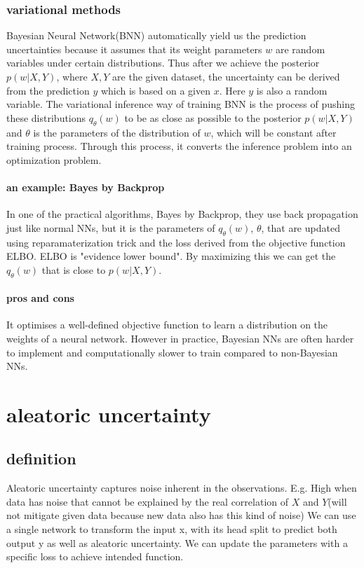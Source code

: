 \documentclass{ctexart}
\begin{document}
\subsubsection{variational methods}
Bayesian Neural Network(BNN) automatically yield us the prediction uncertainties because it assumes that its weight parameters $w$ are random variables under certain distributions. Thus after we achieve the posterior $p(w|X,Y)$, where $X,Y$ are the given dataset, the uncertainty can be derived from the prediction $y$ which is based on a given $x$. Here $y$ is also a random variable. The variational inference way of training BNN is the process of pushing these distributions $q_\theta(w)$ to be as close as possible to the posterior $p(w|X,Y)$ and $\theta$ is the parameters of the distribution of $w$, which will be constant after training process. Through this process, it converts the inference problem into an optimization problem.
\paragraph{an example: Bayes by Backprop}
In one of the practical algorithms, Bayes by Backprop\cite{blundell2015weight}, they use back propagation just like normal NNs, but it is the parameters of $q_\theta(w)$, $\theta$, that are updated using reparamaterization trick and the loss derived from the objective function ELBO. ELBO is "evidence lower bound". By maximizing this we can get the $q_\theta(w)$ that is close to $p(w|X,Y)$.
\paragraph{pros and cons}
It optimises a well-defined objective function to learn a distribution on the weights of a neural network. However in practice, Bayesian NNs are often harder to implement and computationally slower to train compared to non-Bayesian NNs\cite{NIPS2017_7219}.
\section{aleatoric uncertainty}
\subsection{definition}
Aleatoric uncertainty captures noise inherent in the observations.\cite{DBLP:journals/corr/KendallG17} E.g. High when data has noise that cannot be explained by the real correlation of $X$ and $Y$(will not mitigate given data because new data also has this kind of noise)
We can use a single network to transform the input x, with its head split to predict both output y as well as aleatoric uncertainty. We can update the parameters with a specific loss to achieve intended function\cite{DBLP:journals/corr/KendallG17}.
\end{document}
